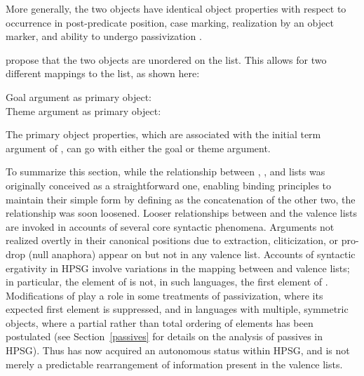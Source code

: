 \documentclass[output=paper
 	        ,biblatex
                ,babelshorthands
                ,newtxmath
                ,draftmode
                ,colorlinks, citecolor=brown
]{langscibook}
\begin{document}
\noindent
More generally, the two objects have identical object properties with respect to occurrence in
post-predicate position, case marking, realization by an object marker, and ability to undergo
passivization \citep[9]{Ackermanetal2017}.

\citet{Ackermanetal2017} propose that the two objects are unordered on the \argst list.  This allows
for two different mappings to the \comps list, as shown here:

\begin{exe} 
\ex		\label{moro-avm1}
\begin{xlist}
\ex Goal argument as primary object: \\
\ex Theme argument as primary object: \\
\end{xlist}
\end{exe}

\noindent
The primary object properties, which are associated with the initial term argument of \comps, can go
with either the goal or theme argument.

To summarize this section, while the relationship between \argst, \subj, and \comps lists was
originally conceived as a straightforward one, enabling binding principles to maintain their simple
form by defining \argst as the concatenation of the other two, the relationship was soon loosened.
Looser relationships between \argst and the valence lists are invoked in accounts of several core
syntactic phenomena.  Arguments not realized overtly in their canonical positions due to extraction,
cliticization, or pro-drop (null anaphora) appear on \argst but not
in any valence list.  Accounts of syntactic ergativity in HPSG involve variations in the mapping
between \argst and valence lists; in particular, the element of \subj is not, in such languages, the
first element of \argst.  Modifications of \argst play a role in some treatments of passivization,
where its expected first element is suppressed, and in languages with multiple, symmetric objects,
where a partial rather than total ordering of \argst elements has been postulated (see
Section~\ref{passives} for details on the analysis of passives in HPSG).  Thus \argst has now
acquired an autonomous %
status within HPSG, and is not merely a predictable rearrangement of information present in the
valence lists.   
\end{document}
